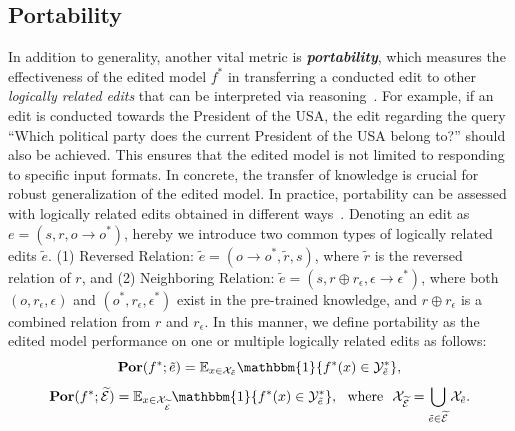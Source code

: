 \documentclass[acmsmall, screen]{acmart}
\begin{document}
\subsection{{Portability}}
{
In addition to generality, another vital metric is \textit{\textbf{portability}}, which measures the effectiveness of the edited model $f^{*}$ in transferring a conducted edit to other \textit{logically related edits} that can be interpreted via reasoning~\cite{zhang2024comprehensive}. For example, if an edit is conducted towards the President of the USA, the edit regarding the query ``Which political party does the current President of the USA belong to?'' should also be achieved. This ensures that the edited model is not limited to responding to specific input formats.  In concrete, the transfer of knowledge is crucial for robust generalization of the edited model. In practice, portability can be assessed with logically related edits obtained in different ways~\cite{yao2023editing,cohen2024evaluating}. Denoting an edit as $e=(s,r,o\rightarrow o^*)$, hereby we introduce two common types of logically related edits $\tilde{e}$. (1) Reversed Relation: $\tilde{e}=(o\rightarrow o^*, \tilde{r},s)$, where $\tilde{r}$ is the reversed relation of $r$, and (2) Neighboring Relation: $\tilde{e}=(s, r\oplus r_\epsilon, \epsilon \rightarrow \epsilon^*)$, where both $(o, r_\epsilon, \epsilon)$ and $(o^*, r_\epsilon, \epsilon^*)$ exist in the pre-trained knowledge, and $r\oplus r_\epsilon$ is a combined relation from $r$ and $r_\epsilon$. In this manner, we define portability as the edited model performance on one or multiple logically related edits as follows:
\begin{equation}
        \textbf{Por}(f^*; \tilde{e})=\mathbb{E}_{x \in \mathcal{X}_{\tilde{e}}} \mathbbm{1}\{f^*(x)\in \mathcal{Y}_{\tilde{e}}^*\},
\end{equation}
\begin{equation}
        \textbf{Por}(f^*; \widetilde{\mathcal{E}})=\mathbb{E}_{x \in \mathcal{X}_{\widetilde{\mathcal{E}}}} \mathbbm{1}\{f^*(x)\in \mathcal{Y}_{\tilde{e}}^*\}, \ \ \text{where}\ \ \mathcal{X}_{\widetilde{\mathcal{E}}}=\bigcup_{\tilde{e}\in\mathcal{\widetilde{E}}}\mathcal{X}_{\tilde{e}}.
\end{equation}
}
\end{document}
